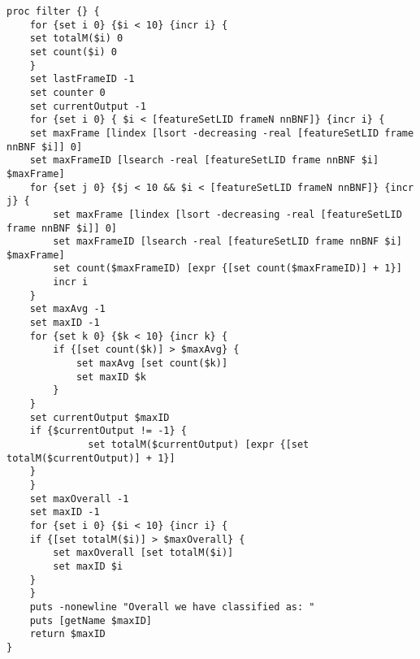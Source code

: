 \begin{lstlisting}[label=lst:CountingFilter,caption=Counting Filter employed to smooth/improve output]
proc filter {} {
    for {set i 0} {$i < 10} {incr i} {
    set totalM($i) 0
    set count($i) 0
    }
    set lastFrameID -1
    set counter 0
    set currentOutput -1
    for {set i 0} { $i < [featureSetLID frameN nnBNF]} {incr i} {
    set maxFrame [lindex [lsort -decreasing -real [featureSetLID frame nnBNF $i]] 0]
    set maxFrameID [lsearch -real [featureSetLID frame nnBNF $i] $maxFrame]
    for {set j 0} {$j < 10 && $i < [featureSetLID frameN nnBNF]} {incr j} {
        set maxFrame [lindex [lsort -decreasing -real [featureSetLID frame nnBNF $i]] 0]
        set maxFrameID [lsearch -real [featureSetLID frame nnBNF $i] $maxFrame]
        set count($maxFrameID) [expr {[set count($maxFrameID)] + 1}]
        incr i
    }
    set maxAvg -1
    set maxID -1
    for {set k 0} {$k < 10} {incr k} {
        if {[set count($k)] > $maxAvg} {
            set maxAvg [set count($k)]
            set maxID $k
        }
    }
    set currentOutput $maxID
    if {$currentOutput != -1} {
              set totalM($currentOutput) [expr {[set totalM($currentOutput)] + 1}]
    }
    }
    set maxOverall -1
    set maxID -1
    for {set i 0} {$i < 10} {incr i} {
    if {[set totalM($i)] > $maxOverall} {
        set maxOverall [set totalM($i)]
        set maxID $i
    }
    }
    puts -nonewline "Overall we have classified as: "
    puts [getName $maxID]
    return $maxID
}
\end{lstlisting}


